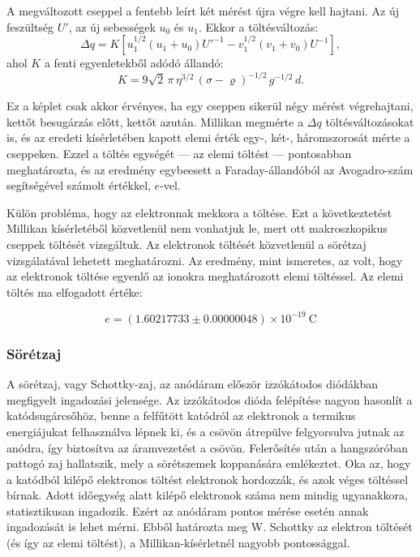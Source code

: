 \documentclass[a4paper,12pt]{article}
\begin{document}
A megváltozott cseppel a fentebb leírt két mérést újra végre kell hajtani.
Az új feszültség $U'$, az új sebességek $u_0$ és $u_1$.
Ekkor a töltésváltozás:
\begin{equation}
\Delta q = K\!\left[ u_1^{1/2}(u_1+u_0){U'}^{-1}
- v_1^{1/2}(v_1+v_0)U^{-1}\right],
\end{equation}
ahol $K$ a fenti egyenletekből adódó állandó:
\begin{equation}
K = 9\sqrt{2}\,\pi\,\eta^{3/2}\,(\sigma-\varrho)^{-1/2}\,g^{-1/2}\,d.
\end{equation}

Ez a képlet csak akkor érvényes, ha egy cseppen sikerül négy mérést
végrehajtani, kettőt besugárzás előtt, kettőt azután.
Millikan megmérte a $\Delta q$ töltésváltozásokat is, és az eredeti
kísérletében kapott elemi érték egy-, két-, háromszorosát mérte a
cseppeken.
Ezzel a töltés egységét — az elemi töltést — pontosabban meghatározta,
és az eredmény egybeesett a Faraday-állandóból az Avogadro-szám
segítségével számolt értékkel, $e$-vel.

Külön probléma, hogy az elektronnak mekkora a töltése. Ezt a következtetést Millikan kísérletéből közvetlenül nem vonhatjuk le, mert ott makroszkopikus cseppek töltését vizsgáltuk.
Az elektronok töltését közvetlenül a sörétzaj vizsgálatával lehetett meghatározni.
Az eredmény, mint ismeretes, az volt, hogy az elektronok töltése
egyenlő az ionokra meghatározott elemi töltéssel.
Az elemi töltés ma elfogadott értéke:

\begin{equation}
e = (1.60217733 \pm 0.00000048)\times 10^{-19}\ \mathrm{C}
\end{equation}

\subsubsection{Sörétzaj}
A sörétzaj, vagy Schottky-zaj, az anódáram először izzókátodos
diódákban megfigyelt ingadozási jelensége.
Az izzókátodos dióda felépítése nagyon hasonlít a katódsugárcsőhöz,
benne a felfűtött katódról az elektronok a termikus energiájukat
felhasználva lépnek ki, és a csövön átrepülve felgyorsulva jutnak
az anódra, így biztosítva az áramvezetést a csövön.
Felerősítés után a hangszóróban pattogó zaj hallatszik, mely a
sörétszemek koppanására emlékeztet.
Oka az, hogy a katódból kilépő elektronos töltést elektronok hordozzák,
és azok véges töltéssel bírnak.
Adott időegység alatt kilépő elektronok száma nem mindig ugyanakkora,
statisztikusan ingadozik.
Ezért az anódáram pontos mérése esetén annak ingadozását is lehet mérni.
Ebből határozta meg W. Schottky az elektron töltését (és így az elemi
töltést), a Millikan-kísérletnél nagyobb pontossággal.
\end{document}
